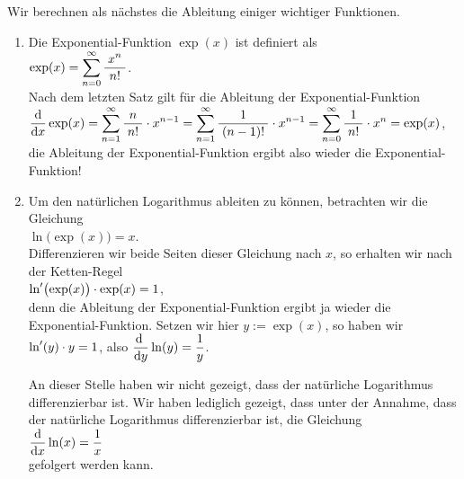 \examples
Wir berechnen als n\"achstes die Ableitung einiger wichtiger Funktionen.  
\begin{enumerate}
\item Die Exponential-Funktion $\exp(x)$ ist definiert als 
      \\[0.3cm]
      \hspace*{1.3cm}
      $\displaystyle\exp(x) = \sum\limits_{n=0}^\infty \displaystyle\frac{\;\displaystyle x^n\;}{\;\displaystyle n!\;}$.
      \\[0.3cm]
      Nach dem letzten Satz gilt f\"ur die Ableitung der Exponential-Funktion 
      \\[0.3cm]
      \hspace*{1.3cm}
      $\displaystyle
         \displaystyle\frac{\textrm{d}}{\textrm{d}x}\exp(x) = \sum\limits_{n=1}^\infty \displaystyle\frac{\;\displaystyle n\;}{\;\displaystyle n!\;} \cdot x^{n-1}
                             = \sum\limits_{n=1}^\infty \displaystyle\frac{\;\displaystyle1\;}{\;\displaystyle(n-1)!\;} \cdot x^{n-1}
                             = \sum\limits_{n=0}^\infty \displaystyle\frac{\;\displaystyle1\;}{\;\displaystyle n!\;} \cdot x^{n} = \exp(x)$,
      \\[0.3cm]
      die Ableitung der Exponential-Funktion ergibt also wieder die Exponential-Funktion!
\item Um den nat\"urlichen Logarithmus ableiten zu k\"onnen, betrachten wir die Gleichung 
      \\[0.3cm]
      \hspace*{1.3cm}
      $\ln\bigl(\exp(x)\bigr) = x$.
      \\[0.3cm]
      Differenzieren wir beide Seiten dieser Gleichung nach $x$, so erhalten wir nach der Ketten-Regel
      \\[0.3cm]
      \hspace*{1.3cm}
      $\displaystyle\ln'\bigl(\exp(x)\bigr)\cdot \exp(x) = 1$,
      \\[0.3cm]
      denn die Ableitung der Exponential-Funktion ergibt ja wieder die
      Exponential-Funktion.  Setzen wir hier $y:= \exp(x)$, so haben wir 
      \\[0.3cm]
      \hspace*{1.3cm}
      $\displaystyle\ln'(y) \cdot y = 1$, \quad also \quad
      $\displaystyle\frac{\mathrm{d}\;}{\mathrm{d}y}\ln(y) = \frac{1}{y}$.

      \remark
      An dieser Stelle haben wir nicht gezeigt, dass der nat\"urliche Logarithmus differenzierbar
      ist.  Wir haben lediglich gezeigt, dass unter der Annahme, dass der nat\"urliche Logarithmus
      differenzierbar ist, die Gleichung 
      \\[0.2cm]
      \hspace*{1.3cm}
      $\displaystyle \displaystyle\frac{\textrm{d}}{\textrm{d}x}\ln(x) = \frac{1}{x}$
      \\[0.2cm]
      gefolgert werden kann.  \eox
      


\end{enumerate}
